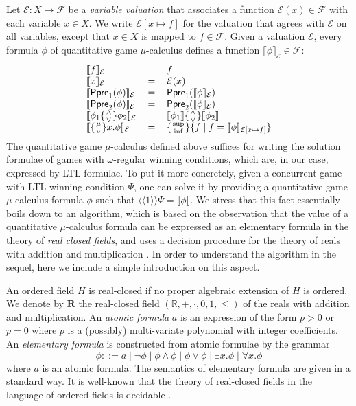 \documentclass[times, 10 pt,twocolumn]{article}
\newcommand{\mb}[1]{\mathbb{#1}}
\newcommand{\mc}[1]{\mathcal{#1}}
\newcommand{\lla}{\langle\langle}
\newcommand{\rra}{\rangle\rangle}
\newcommand{\lb}{\llbracket}
\newcommand{\rb}{\rrbracket}
\newcommand{\Ppre}{\textsf{Ppre}}
\begin{document}
Let $\mc{E}: X\rightarrow \mc{F}$ be a \emph{variable valuation}
that associates a function $\mc{E}(x)\in \mc{F}$ with each
variable $x\in X$. We write $\mc{E}[x\mapsto f]$ for the valuation
that agrees with $\mc{E}$ on all variables, except that $x\in X$
is mapped to $f\in \mc{F}$. Given a valuation $\mc{E}$, every
formula $\phi$ of quantitative game $\mu$-calculus defines a
function $\lb \phi\rb_{\mc{E}}\in \mc{F}$:
\[
\begin{tabular}{lll}
  $\lb f\rb_{\mc{E}} $ & =  & $f$\\
  $\lb x\rb_{\mc{E}} $ & =  & $\mc{E}(x)$\\
  $\lb \Ppre_1(\phi)\rb_{\mc{E}} $ & =  & $\Ppre_1(\lb\phi\rb_{\mc{E}})$\\
  $\lb \Ppre_2(\phi)\rb_{\mc{E}} $ & =  & $\Ppre_2(\lb\phi\rb_{\mc{E}})$\\
  $\lb \phi_1\{\genfrac{}{}{0pt}{}{\wedge}{\vee}\}\phi_2\rb_{\mc{E}} $ & =  & $\lb \phi_1\rb \{\genfrac{}{}{0pt}{}{\wedge}{\vee}\} \lb \phi_2\rb $\\
  $\lb \{\genfrac{}{}{0pt}{}{\mu}{\nu}\}x.\phi\rb_{\mc{E}} $ & = & $\{\genfrac{}{}{0pt}{}{\sup}{\inf}\}\{f\mid f=\lb\phi\rb_{\mc{E}[x\mapsto f]}\}$
\end{tabular}
\]
%
%
The quantitative game $\mu$-calculus defined above suffices for
writing the solution formulae of games with $\omega$-regular
winning conditions, which are, in our case, expressed by LTL
formulae. To put it more concretely, given a concurrent game with
LTL winning condition $\Psi$, one can solve it by providing a
quantitative game $\mu$-calculus formula $\phi$ such that $\lla
1\rra \Psi =
\lb\phi\rb$. We stress that this fact essentially boils down to %
an algorithm, which is based on the observation that the value of
a quantitative $\mu$-calculus formula can be expressed as an
elementary formula in the theory of \emph{real closed fields}, and
uses a decision procedure for the theory of reals with addition
and multiplication \cite{Tar51}. In order to understand the
algorithm in the sequel, here we include a simple introduction
on this aspect. %
%

An ordered field $H$ is real-closed if no proper algebraic
extension of $H$ is ordered. We denote by $\mathbf{R}$ the
real-closed field $(\mb{R}, +, \cdot, 0,1, \leq)$ of the reals
with addition and multiplication. An \emph{atomic formula} $a$ is
an expression of the form $p>0$ or $p=0$ where $p$ is a (possibly)
multi-variate polynomial with integer coefficients. An
\emph{elementary formula} is constructed from atomic formulae by
the grammar
\[\phi::= a \mid \neg \phi \mid \phi\wedge \phi\mid \phi\vee \phi \mid \exists x.\phi\mid \forall x.\phi\]
where $a$ is an atomic formula. The semantics of elementary
formula are given in a standard way. It is well-known that the
theory of real-closed fields in the language of ordered fields is
decidable \cite{Tar51}.
\end{document}
